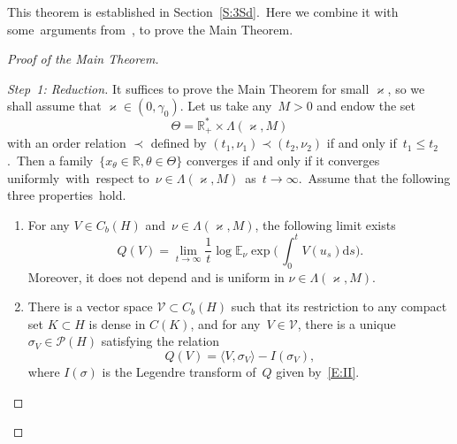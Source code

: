 \documentclass[10pt]{amsart}
\theoremstyle{definition}\newtheorem{defi}[theo]{Definition}\newtheorem{rema}[theo]{Remark}\newtheorem{exam}[theo]{Example}\newtheorem{exem}[theo]{Example}\newtheorem{nota}[theo]{Notation}
\newcommand{\R}{{\mathbb R}}
\newcommand{\E}{{\mathbb E}}
\newcommand{\PP}{{\mathcal P}}
\newcommand{\VV}{{\mathcal V}}
\newcommand{\vk}{{\varkappa}}
\newcommand{\ty}{\infty}
\newcommand{\lag}{\langle}
\newcommand{\rag}{\rangle}
\newcommand{\dd}{\mathrm{d}}
\newenvironment{step}{\begin{proof}}{\let\qed\relax \end{proof}}
\newenvironment{proofc}[1][\proofname]{\begin{proof}[{#1}]}{\end{proof}}
\begin{document}
This theorem is established in Section~\ref{S:3Sd}.~Here we combine it with some~arguments from~\cite{JNPS-2014, MN-2015}, to prove the Main Theorem.

\begin{proofc}[Proof of the Main Theorem]

\begin{step}[Step~1: Reduction]
It suffices to prove the Main Theorem for small $\vk$, so we shall assume that $\vk\in (0, \gamma_0)$.
Let us take any~$M>0$ and endow the set
\[
\Theta= \R^*_+\times\Lambda(\vk,M)
\]
with an order relation $\prec$ defined by $(t_1,\nu_1)\prec (t_2,\nu_2)$ if and only if~$t_1\le t_2$.~Then a family~$\{x_\theta\in \R,\theta\in\Theta\}$ converges if and only if it converges uniformly~with~respect to~$\nu\in\Lambda(\vk,M)$~as~$t\to\ty$.~Assume that the following three properties~hold.
\begin{enumerate}
\item \label{prop1} For any $V\in C_b(H)$ and~$\nu\in \Lambda(\vk,M)$, the following limit exists
\[
Q(V)=\lim_{t\to\ty} \frac{1}{t}
\log \E_\nu \exp \biggl(\,\int_0^tV(u_s)\dd s\biggr).
\]
Moreover, it does not depend and is uniform in $\nu\in \Lambda(\vk,M)$.

\item \label{prop2} There is a vector space $\VV\subset C_b(H)$ such that its restriction to any compact set $K\subset H$ is dense in $C(K)$, and for any~$V\in \VV $, there is a unique~$\sigma_V\in \PP(H)$ satisfying the relation
\begin{equation}\label{equilhdd}
Q(V)= \lag V, \sigma_V\rag-I(\sigma_V),
\end{equation}
where $I(\sigma)$ is the Legendre transform of~$Q$ given by~\eqref{E:II}.


\end{enumerate}
\end{step}
\end{proofc}
\end{document}
